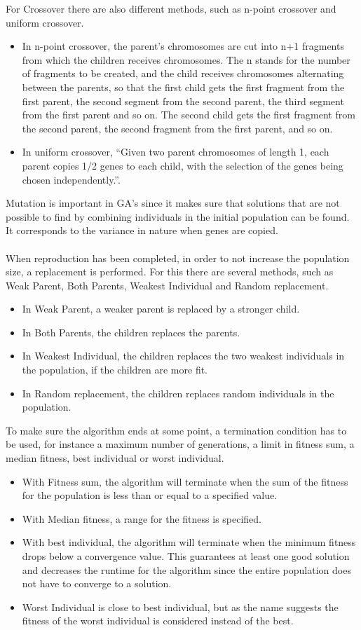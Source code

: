 For Crossover there are also different methods, such as n-point crossover and uniform crossover.
\begin{itemize}
\item In n-point crossover, the parent's chromosomes are cut into n+1 fragments from which the children receives chromosomes. The n stands for the number of fragments to be created, and the child receives chromosomes alternating between the parents, so that the first child gets the first fragment from the first parent, the second segment from the second parent, the third segment from the first parent and so on. The second child gets the first fragment from the second parent, the second fragment from the first parent, and so on.
\item In uniform crossover, ``Given two parent chromosomes of length 1, each parent copies 1/2 genes to each child, with the selection of the genes being chosen independently.''\cite{GAHandbook1}.
\end{itemize}
Mutation is important in GA's since it makes sure that solutions that are not possible to find by combining individuals in the initial population can be found. It corresponds to the variance in nature when genes are copied.\\\\ %
When reproduction has been completed, in order to not increase the population size, a replacement is performed. For this there are several methods, such as Weak Parent, Both Parents, Weakest Individual and Random replacement.
\begin{itemize}
\item In Weak Parent, a weaker parent is replaced by a stronger child.
\item In Both Parents, the children replaces the parents.
\item In Weakest Individual, the children replaces the two weakest individuals in the population, if the children are more fit.
\item In Random replacement, the children replaces random individuals in the population.
\end{itemize}
To make sure the algorithm ends at some point, a termination condition has to be used, for instance a maximum number of generations, a limit in fitness sum, a median fitness, best individual or worst individual.
\begin{itemize}
\item With Fitness sum, the algorithm will terminate when the sum of the fitness for the population is less than or equal to a specified value.
\item With Median fitness, a range for the fitness is specified.
\item With best individual, the algorithm will terminate when the minimum fitness drops below a convergence value. This guarantees at least one good solution and decreases the runtime for the algorithm since the entire population does not have to converge to a solution.
\item Worst Individual is close to best individual, but as the name suggests the fitness of the worst individual is  considered instead of the best.
\end{itemize}
